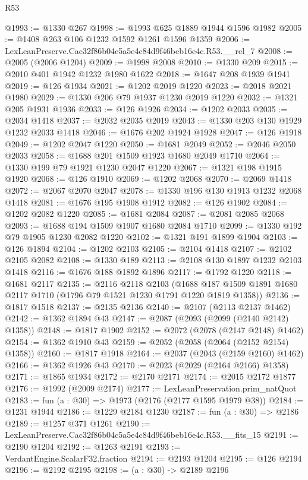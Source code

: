 \begin{lexlean}{R53}
\begin{coremodule}
@1993 := @1330 @267
@1998 := @1993 @625 @1889 @1944 @1596 @1982
@2005 := @1408 @263 @106 @1232 @1592 @1261 @1596 @1359
@2006 := LexLeanPreserve.Cac32f86b04c5a5e4c84d9f46beb16e4c.R53.__rel_7
@2008 := @2005 (@2006 @1204)
@2009 := @1998 @2008
@2010 := @1330 @209
@2015 := @2010 @401 @1942 @1232 @1980 @1622
@2018 := @1647 @208 @1939 @1941
@2019 := @126 @1934
@2021 := @1202 @2019 @1220
@2023 := @2018 @2021 @1980
@2029 := @1330 @206 @79 @1937 @1230 @2019 @1220
@2032 := @1321 @205 @1931 @1936
@2033 := @126 @1926
@2034 := @1202 @2033
@2035 := @2034 @1418
@2037 := @2032 @2035 @2019
@2043 := @1330 @203 @130 @1929 @1232 @2033 @1418
@2046 := @1676 @202 @1924 @1928
@2047 := @126 @1918
@2049 := @1202 @2047 @1220
@2050 := @1681 @2049
@2052 := @2046 @2050 @2033
@2058 := @1688 @201 @1509 @1923 @1680 @2049 @1710
@2064 := @1330 @199 @79 @1921 @1230 @2047 @1220
@2067 := @1321 @198 @1915 @1920
@2068 := @126 @1910
@2069 := @1202 @2068
@2070 := @2069 @1418
@2072 := @2067 @2070 @2047
@2078 := @1330 @196 @130 @1913 @1232 @2068 @1418
@2081 := @1676 @195 @1908 @1912
@2082 := @126 @1902
@2084 := @1202 @2082 @1220
@2085 := @1681 @2084
@2087 := @2081 @2085 @2068
@2093 := @1688 @194 @1509 @1907 @1680 @2084 @1710
@2099 := @1330 @192 @79 @1905 @1230 @2082 @1220
@2102 := @1321 @191 @1899 @1904
@2103 := @126 @1894
@2104 := @1202 @2103
@2105 := @2104 @1418
@2107 := @2102 @2105 @2082
@2108 := @1330 @189
@2113 := @2108 @130 @1897 @1232 @2103 @1418
@2116 := @1676 @188 @1892 @1896
@2117 := @1792 @1220
@2118 := @1681 @2117
@2135 := @2116
    @2118
    @2103
    (@1688 @187 @1509 @1891 @1680 @2117 @1710 (@1796 @79 @1521 @1230 @1791 @1220 @1819 @1358))
@2136 := @1817 @1518
@2137 := @2135 @2136
@2140 := @2107 (@2113 @2137 @1462)
@2142 := @1362 @1894 @43
@2147 := @2087 (@2093 (@2099 (@2140 @2142) @1358))
@2148 := @1817 @1902
@2152 := @2072 (@2078 (@2147 @2148) @1462)
@2154 := @1362 @1910 @43
@2159 := @2052 (@2058 (@2064 (@2152 @2154) @1358))
@2160 := @1817 @1918
@2164 := @2037 (@2043 (@2159 @2160) @1462)
@2166 := @1362 @1926 @43
@2170 := @2023 (@2029 (@2164 @2166) @1358)
@2171 := @1865 @1934
@2172 := @2170 @2171
@2174 := @2015 @2172 @1877
@2176 := @1992 (@2009 @2174)
@2177 := LexLeanPreservation.prim_natQuot
@2183 := fun (a : @30) => @1973 (@2176 (@2177 @1595 @1979 @38))
@2184 := @1231 @1944
@2186 := @1229 @2184 @1230
@2187 := fun (a : @30) => @2186
@2189 := @1257 @371 @1261
@2190 := LexLeanPreserve.Cac32f86b04c5a5e4c84d9f46beb16e4c.R53.__fits_15
@2191 := @2190 @1204
@2192 := @1263 @2191
@2193 := VerdantEngine.ScalarF32.fraction
@2194 := @2193 @1204
@2195 := @126 @2194
@2196 := @2192 @2195
@2198 := (a : @30) -> @2189 @2196

\end{coremodule}
\end{lexlean}
